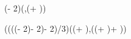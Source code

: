 \documentclass[dark]{cgem-poster}
\begin{document}

  \newlength{\PosterOuterMarginSize}
  \setlength{\PosterOuterMarginSize}{1cm}

  \newcommand{\PosterBackgroundLeft}{\PosterOuterMarginSize}
  \newcommand{\PosterBackgroundWidth}{\dimexpr (\pagewidth - 2\PosterOuterMarginSize)\relax}
  \newcommand{\PosterBackgroundTop}{\dimexpr (\titleheight + \PosterOuterMarginSize)\relax}
  \newcommand{\PosterBackgroundHeight}{\dimexpr (\pageheight - \PosterBackgroundTop - \PosterOuterMarginSize)\relax}
  
  \begin{textblock*}{\PosterBackgroundWidth{}}(\PosterBackgroundLeft{},\PosterBackgroundTop{})
    \begin{minipage}[t][\PosterBackgroundHeight{}][t]{\PosterBackgroundWidth{}}
    \end{minipage}
  \end{textblock*}

  \newlength{\PosterInnerMarginSize}
  \setlength{\PosterInnerMarginSize}{1cm}
  
  \newcommand{\PosterInnerLeft}{\dimexpr (\PosterOuterMarginSize + \PosterInnerMarginSize)\relax}
  \newcommand{\PosterInnerWidth}{\dimexpr (\PosterBackgroundWidth - 2\PosterInnerMarginSize)\relax}
  \newcommand{\PosterInnerTop}{\dimexpr (\PosterBackgroundTop + \PosterInnerMarginSize)\relax}
  \newcommand{\PosterInnerHeight}{\dimexpr (\PosterBackgroundHeight - 2\PosterInnerMarginSize)\relax}

  \newcommand{\PosterColumnWidth}{\dimexpr ((\PosterInnerWidth - 2\PosterInnerMarginSize)/3)\relax}
   
  \newcommand{\PosterColumnOneLeft}{\PosterInnerLeft}
  \newcommand{\PosterColumnOneWidth}{\PosterColumnWidth}
  \newcommand{\PosterColumnOneTop}{\PosterInnerTop}
  \newcommand{\PosterColumnOneHeight}{\PosterInnerHeight}

  \begin{textblock*}{\PosterColumnOneWidth{}}(\PosterColumnOneLeft{},\PosterColumnOneTop{})
    \begin{minipage}[t][\PosterColumnOneHeight{}][t]{\PosterColumnOneWidth{}}
    \end{minipage}
  \end{textblock*}
\end{document}
